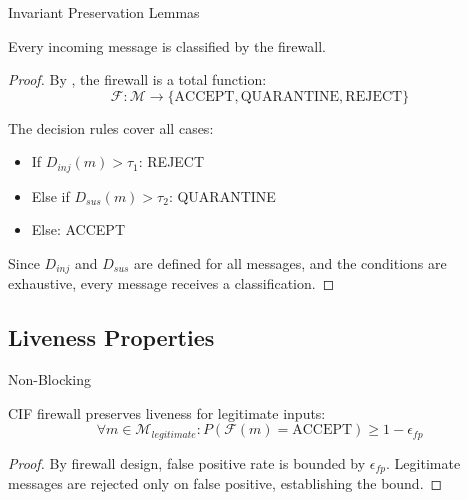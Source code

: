\documentclass[
  ignorenonframetext,
]{beamer}
\providecommand{\cref}[1]{\texttt{\detokenize{#1}}}
\begin{document}
\begin{frame}[allowframebreaks]{Invariant Preservation Lemmas}
\begin{lemma}
\label{lem:firewall-completeness}
Every incoming message is classified by the firewall.
\end{lemma}

\begin{proof}
By \cref{def:firewall}, the firewall is a total function:
\begin{equation}
\label{eq:firewall-function}
\mathcal{F}: \mathcal{M} \to \{\text{ACCEPT}, \text{QUARANTINE}, \text{REJECT}\}
\end{equation}

The decision rules cover all cases:
\begin{itemize}
\item If $D_{inj}(m) > \tau_1$: REJECT
\item Else if $D_{sus}(m) > \tau_2$: QUARANTINE
\item Else: ACCEPT
\end{itemize}

Since $D_{inj}$ and $D_{sus}$ are defined for all messages, and the conditions are exhaustive, every message receives a classification.
\end{proof}
\end{frame}

\subsection{Liveness Properties}\label{sec:liveness-properties}

\begin{frame}[allowframebreaks]{Non-Blocking}
\protect{}\label{sec:non-blocking}
\begin{theorem}
\label{thm:firewall-liveness}
CIF firewall preserves liveness for legitimate inputs:
\begin{equation}
\label{eq:firewall-liveness}
\forall m \in \mathcal{M}_{legitimate}: P(\mathcal{F}(m) = \text{ACCEPT}) \geq 1 - \epsilon_{fp}
\end{equation}
\end{theorem}

\begin{proof}
By firewall design, false positive rate is bounded by $\epsilon_{fp}$. Legitimate messages are rejected only on false positive, establishing the bound.
\end{proof}
\end{frame}
\end{document}
